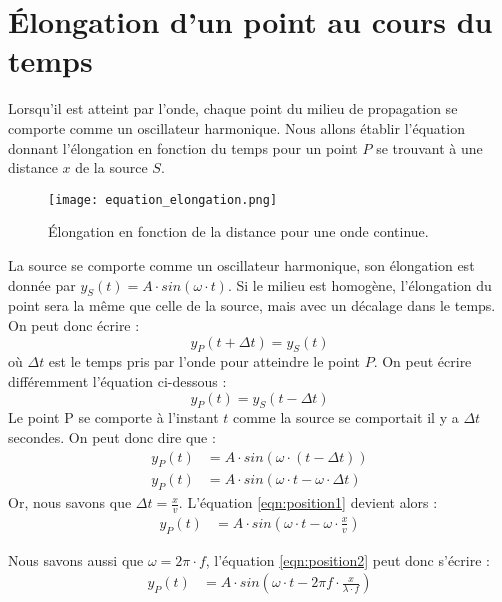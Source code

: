 \section{Élongation d'un point au cours du temps}
Lorsqu'il est atteint par l'onde, chaque point du milieu de propagation se comporte comme un oscillateur harmonique. Nous allons établir l'équation donnant l'élongation en fonction du temps pour un point \(P\) se trouvant à une distance \(x\) de la source \(S\).

\begin{figure}[ht!]
    \centering
    \texttt{[image: equation\_elongation.png]}
    \caption{Élongation en fonction de la distance pour une onde continue.}
    \label{equation_elongation}
\end{figure}

La source se comporte comme un oscillateur harmonique, son élongation est donnée par  \(y_S (t)=A \cdot sin(\omega \cdot t)\).
Si le milieu est homogène, l'élongation du point sera la même que celle de la source, mais avec un décalage dans le temps. On peut donc écrire :
\begin{equation}
    y_P (t + \Delta t)   = y_S (t)
\end{equation}
où \(\Delta t\) est le temps pris par l'onde pour atteindre le point \(P\).
On peut écrire différemment l'équation ci-dessous :
\begin{equation}
    y_P (t)   = y_S (t - \Delta t)
\end{equation}
Le point P se comporte à l'instant \(t\) comme la source se comportait il y a \(\Delta t\) secondes.
On peut donc dire que :
\begin{align}
    y_P (t) & = A \cdot sin (\omega \cdot(t-\Delta t))             \\
    y_P (t) & = A \cdot sin (\omega \cdot t-\omega \cdot \Delta t)
    \label{eqn:position1}
\end{align}
Or, nous savons que \(\Delta t =\frac{x}{v}\). L'équation \ref{eqn:position1} devient alors :
\begin{align}
    y_P (t) & = A \cdot sin (\omega \cdot t-\omega \cdot \frac{x}{v})
    \label{eqn:position2}
\end{align}

Nous savons aussi que \(\omega = 2 \pi \cdot f\), l'équation \ref{eqn:position2} peut donc s'écrire :
\begin{align}
    y_P (t) & = A \cdot sin (\omega \cdot t-2 \pi f \cdot \frac{x}{\lambda \cdot f})
    \label{eqn:position3}
\end{align}

